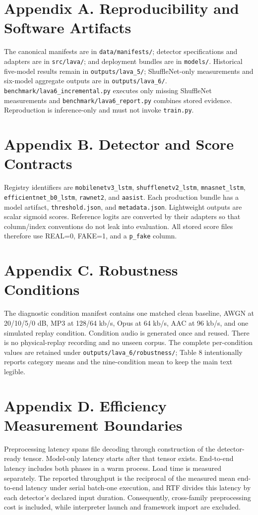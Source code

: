 \documentclass[10pt,journal]{IEEEtran}
\begin{document}
\section{Appendix A. Reproducibility and Software Artifacts}
The canonical manifests are in \texttt{data/manifests/}; detector specifications and adapters are in \texttt{src/lava/}; and deployment bundles are in \texttt{models/}. Historical five-model results remain in \texttt{outputs/lava\_5/}; ShuffleNet-only measurements and six-model aggregate outputs are in \texttt{outputs/lava\_6/}. \texttt{benchmark/lava6\_incremental.py} executes only missing ShuffleNet measurements and \texttt{benchmark/lava6\_report.py} combines stored evidence. Reproduction is inference-only and must not invoke \texttt{train.py}.

\section{Appendix B. Detector and Score Contracts}
Registry identifiers are \texttt{mobilenetv3\_lstm}, \texttt{shufflenetv2\_lstm}, \texttt{mnasnet\_lstm}, \texttt{efficientnet\_b0\_lstm}, \texttt{rawnet2}, and \texttt{aasist}. Each production bundle has a model artifact, \texttt{threshold.json}, and \texttt{metadata.json}. Lightweight outputs are scalar sigmoid scores. Reference logits are converted by their adapters so that column/index conventions do not leak into evaluation. All stored score files therefore use REAL=0, FAKE=1, and a \texttt{p\_fake} column.

\section{Appendix C. Robustness Conditions}
The diagnostic condition manifest contains one matched clean baseline, AWGN at 20/10/5/0 dB, MP3 at 128/64 kb/s, Opus at 64 kb/s, AAC at 96 kb/s, and one simulated replay condition. Condition audio is generated once and reused. There is no physical-replay recording and no unseen corpus. The complete per-condition values are retained under \texttt{outputs/lava\_6/robustness/}; Table 8 intentionally reports category means and the nine-condition mean to keep the main text legible.

\section{Appendix D. Efficiency Measurement Boundaries}
Preprocessing latency spans file decoding through construction of the detector-ready tensor. Model-only latency starts after that tensor exists. End-to-end latency includes both phases in a warm process. Load time is measured separately. The reported throughput is the reciprocal of the measured mean end-to-end latency under serial batch-one execution, and RTF divides this latency by each detector's declared input duration. Consequently, cross-family preprocessing cost is included, while interpreter launch and framework import are excluded.
\end{document}
